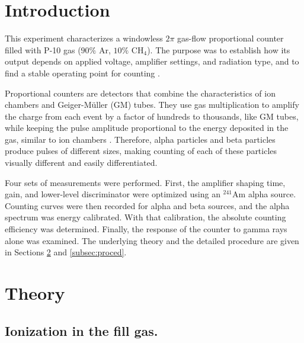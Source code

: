 \documentclass[12pt]{article}
\begin{document}
\begingroup
  \setlength{\parskip}{0pt} %
  \tableofcontents
\endgroup

\newpage

\begin{abstract}

{}



\end{abstract}

\section{Introduction}

This experiment characterizes a windowless $2 \pi$ gas-flow proportional counter filled with P-10 gas ($90 \%$ Ar, $10 \%$ $\text{CH}_4$). The purpose was to establish how its output depends on applied voltage, amplifier settings, and radiation type, and to find a stable operating point for counting \cite{labmanual}.

Proportional counters are detectors that combine the characteristics of ion chambers and Geiger-M\"uller (GM) tubes. They use gas multiplication to amplify the charge from each event by a factor of hundreds to thousands, like GM tubes, while keeping the pulse amplitude proportional to the energy deposited in the gas, similar to ion chambers \cite{knoll}. Therefore, alpha particles and beta particles produce pulses of different sizes, making counting of each of these particles visually different and easily differentiated.

Four sets of measurements were performed. First, the amplifier shaping time, gain, and lower-level discriminator were optimized using an $^{241}$Am alpha source. Counting curves were then recorded for alpha and beta sources, and the alpha spectrum was energy calibrated. With that calibration, the absolute counting efficiency was determined. Finally, the response of the counter to gamma rays alone was examined. The underlying theory and the detailed procedure are given in Sections \ref{sec:theory} and \ref{subsec:proced}.

\section{Theory}
\label{sec:theory}

\subsection{Ionization in the fill gas.}
\label{subsec:ionization}
\end{document}
